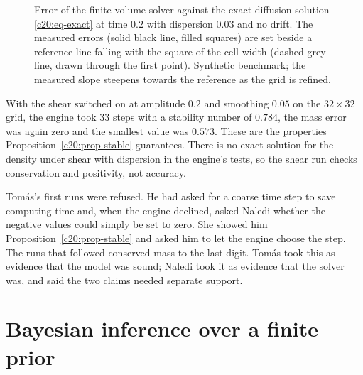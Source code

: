 \begin{figure}[ht]
\centering
{}
\caption{Error of the finite-volume solver against the exact diffusion solution \eqref{c20:eq-exact} at time
$0.2$ with dispersion $0.03$ and no drift. The measured errors (solid black line, filled squares) are set
beside a reference line falling with the square of the cell width (dashed grey line, drawn through the
first point). Synthetic benchmark; the measured slope steepens towards the reference as the grid is
refined.}
\label{c20:fig-refine}
\end{figure}

With the shear switched on at amplitude $0.2$ and smoothing $0.05$ on the $32\times32$ grid, the
engine took 33 steps with a stability number of $0.784$, the mass error was again zero and the
smallest value was $0.573$. These are the properties Proposition~\ref{c20:prop-stable} guarantees. There is no
exact solution for the density under shear with dispersion in the engine's tests, so the shear
run checks conservation and positivity, not accuracy.

Tom\'as's first runs were refused. He had asked for a coarse time step to save computing
time and, when the engine declined, asked Naledi whether the negative values could simply
be set to zero. She showed him Proposition~\ref{c20:prop-stable} and asked him to let the engine choose the
step. The runs that followed conserved mass to the last digit. Tom\'as took this as evidence
that the model was sound; Naledi took it as evidence that the solver was, and said the two
claims needed separate support.

\section{Bayesian inference over a finite prior}

